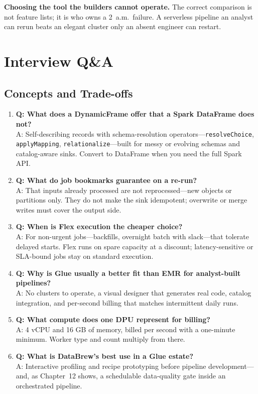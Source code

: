 \begin{pitfall}
\textbf{Choosing the tool the builders cannot operate.} The correct comparison is not feature lists; it is who owns a 2~a.m.\ failure. A serverless pipeline an analyst can rerun beats an elegant cluster only an absent engineer can restart.
\end{pitfall}

\section{Interview Q\&A}
\subsection{Concepts and Trade-offs}
\begin{enumerate}
    \item \textbf{Q: What does a DynamicFrame offer that a Spark DataFrame does not?}\\
    A: Self-describing records with schema-resolution operators---\texttt{resolveChoice}, \texttt{applyMapping}, \texttt{relationalize}---built for messy or evolving schemas and catalog-aware sinks. Convert to DataFrame when you need the full Spark API.
    \item \textbf{Q: What do job bookmarks guarantee on a re-run?}\\
    A: That inputs already processed are not reprocessed---new objects or partitions only. They do not make the sink idempotent; overwrite or merge writes must cover the output side.
    \item \textbf{Q: When is Flex execution the cheaper choice?}\\
    A: For non-urgent jobs---backfills, overnight batch with slack---that tolerate delayed starts. Flex runs on spare capacity at a discount; latency-sensitive or SLA-bound jobs stay on standard execution.
    \item \textbf{Q: Why is Glue usually a better fit than EMR for analyst-built pipelines?}\\
    A: No clusters to operate, a visual designer that generates real code, catalog integration, and per-second billing that matches intermittent daily runs.
    \item \textbf{Q: What compute does one DPU represent for billing?}\\
    A: 4 vCPU and 16 GB of memory, billed per second with a one-minute minimum. Worker type and count multiply from there.
    \item \textbf{Q: What is DataBrew's best use in a Glue estate?}\\
    A: Interactive profiling and recipe prototyping before pipeline development---and, as Chapter~12 shows, a schedulable data-quality gate inside an orchestrated pipeline.
\end{enumerate}

